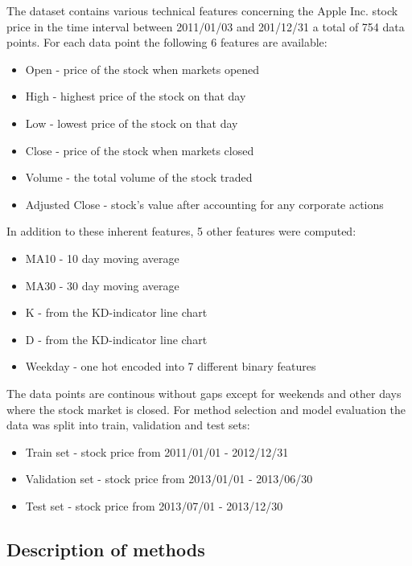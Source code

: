 \documentclass[utf8x]{ctexart}
\begin{document}
The dataset contains various technical features concerning the Apple Inc. stock price in the time interval between 2011/01/03 and 201/12/31 a total of 754 data points.
For each data point the following 6 features are available:
\begin{itemize}
    \item Open - price of the stock when markets opened
    \item High - highest price of the stock on that day
    \item Low - lowest price of the stock on that day
    \item Close - price of the stock when markets closed
    \item Volume - the total volume of the stock traded
    \item Adjusted Close - stock's value after accounting for any corporate actions
\end{itemize}

In addition to these inherent features, 5 other features were computed:
\begin{itemize}
    \item MA10 - 10 day moving average
    \item MA30 - 30 day moving average
    \item K - from the KD-indicator line chart
    \item D - from the KD-indicator line chart
    \item Weekday - one hot encoded into 7 different binary features
\end{itemize}

The data points are continous without gaps except for weekends and other days where the stock market is closed.
For method selection and model evaluation the data was split into train, validation and test sets:
\begin{itemize}
    \item Train set - stock price from 2011/01/01 - 2012/12/31
    \item Validation set - stock price from 2013/01/01 - 2013/06/30
    \item Test set - stock price from 2013/07/01 - 2013/12/30
\end{itemize}


\subsection{Description of methods}
\end{document}
